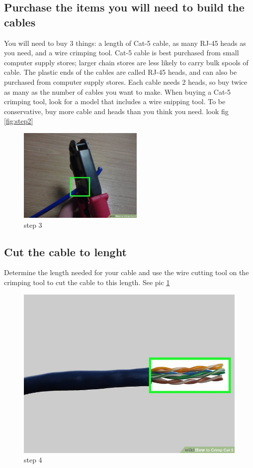 \documentclass[a4paper,12pt]{book}
\begin{document}
\subsection{Purchase the items you will need to build the cables}
You will need to buy 3 things: a length of Cat-5 cable, as many RJ-45 heads as you need, and a wire crimping tool. Cat-5 cable is best purchased from small computer supply stores; larger chain stores are less likely to carry bulk spools of cable. The plastic ends of the cables are called RJ-45 heads, and can also be purchased from computer supply stores. Each cable needs 2 heads, so buy twice as many as the number of cables you want to make. When buying a Cat-5 crimping tool, look for a model that includes a wire snipping tool. To be conservative, buy more cable and heads than you think you need. look fig \ref{fig:step2}

\begin{figure}
\centering
\includegraphics[width= 6cm]{./step3.JPG}
\caption{step 3}\label{fig:step3}
\end{figure}

\subsection{Cut the cable to lenght}
Determine the length needed for your cable and use the wire cutting tool on the crimping tool to cut the cable to this length. See pic \ref{fig:step3}

\begin{figure}
\centering
\includegraphics[width= 13cm]{./step4.JPG}
\caption{step 4}\label{fig:step4}
\end{figure}
\end{document}
